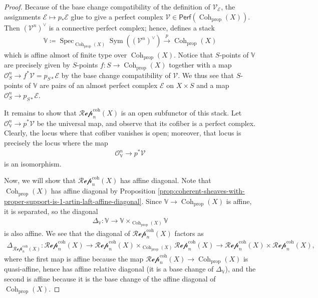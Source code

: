 \documentclass{article}
\numberwithin{equation}{section}
\theoremstyle{quest}
\theoremstyle{definition}
\theoremstyle{remark}
\DeclareMathOperator{\Spec}{Spec}
\DeclareMathOperator{\Sym}{Sym}
\DeclareMathOperator{\Coh}{Coh}
\begin{document}
\begin{proof}
	Because of the base change compatibility of the definition of $\mathscr{V}_{\mathscr{E}}$, the assignments $\mathscr{E}\mapsto p_*\mathscr{E}$ glue to give a perfect complex $\mathscr{V}\in\mathsf{Perf}(\Coh_{\text{prop}}(X))$. Then $(\mathscr{V}^n)^\vee$ is a connective perfect complex; hence, defines a stack
\begin{align*}
	\mathbb{V}\coloneqq \Spec_{\Coh_{\text{prop}}(X)}\Sym((\mathscr{V}^n)^\vee)\xrightarrow{p} \Coh_{\text{prop}}(X)
\end{align*} 
which is affine almost of finite type over $\Coh_{\text{prop}}(X)$. Notice that $S$-points of $\mathbb{V}$ are precisely given by $S$-points $f:S\to \Coh_{\text{prop}}(X)$ together with a map $\mathscr{O}^n_S\to f^*\mathscr{V} = p_{S*}\mathscr{E}$ by the base change compatibility of $\mathscr{V}$. We thus see that $S$-points of $\mathbb V$ are pairs of an almost perfect complex $\mathscr{E}$ on $X\times S$ and a map $\mathscr{O}^n_S\to p_{S*}\mathscr{E}$.

It remains to show that $\mathscr{Rep}_n^{\text{coh}}(X)$ is an open subfunctor of this stack. Let $\mathscr{O}^n_{\mathbb{V} }\to p^*\mathscr{V}$ be the universal map, and observe that its cofiber is a perfect complex. Clearly, the locus where that cofiber vanishes is open; moreover, that locus is precisely the locus where the map
\begin{align*}
	\mathscr{O}^n_{\mathbb{V} }\to p^*\mathscr{V}
\end{align*} 
is an isomorphism.

Now, we will show that $\mathscr{Rep}_n^{\text{coh}}(X)$ has affine diagonal. Note that $\Coh_{\text{prop}}(X)$ has affine diagonal by Proposition \ref{prop:coherent-sheaves-with-proper-support-is-1-artin-laft-affine-diagonal}. Since $\mathbb V\to \Coh_{\text{prop}}(X)$ is affine, it is separated, so the diagonal 
\begin{align*}
	\Delta_{\mathbb{V} }:\mathbb{V} \to \mathbb{V} \times _{\Coh_{\text{prop}}(X)}\mathbb{V} 
\end{align*} 
is also affine. We see that the diagonal of $\mathscr{Rep}_n^{\text{coh}}(X)$ factors as
\begin{align*}
	\Delta_{\mathscr{Rep}_n^{\text{coh}}(X)}:\mathscr{Rep}_n^{\text{coh}}(X)\to \mathscr{Rep}_n^{\text{coh}}(X)\times _{\Coh_{\text{prop}}(X)}\mathscr{Rep}_n^{\text{coh}}(X)\to \mathscr{Rep}_n^{\text{coh}}(X)\times \mathscr{Rep}_n^{\text{coh}}(X),
\end{align*} 
where the first map is affine because the map $\mathscr{Rep}_n^{\text{coh}}(X)\to \Coh_{\text{prop}}(X)$ is quasi-affine, hence has affine relative diagonal (it is a base change of $\Delta_\mathbb{V} $), and the second is affine because it is the base change of the affine diagonal of $\Coh_{\text{prop}}(X)$.
\end{proof}
\end{document}
